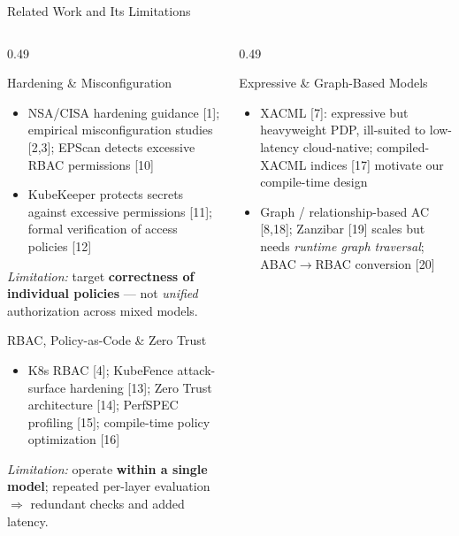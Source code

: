\documentclass[aspectratio=169,10pt]{beamer}
\newcommand{\tightitems}{%
  \setlength{\topsep}{1pt}%
  \setlength{\itemsep}{2pt}%
  \setlength{\parsep}{0pt}%
  \setlength{\parskip}{0pt}%
}
\begin{document}
\begin{frame}[t]{Related Work and Its Limitations}
\vspace{2pt}
\begin{columns}[T,onlytextwidth]
\begin{column}{0.49\textwidth}
\begin{callout}[fonttitle=\bfseries\scriptsize,fontupper=\tiny]{Hardening \& Misconfiguration}
\begin{itemize}\tightitems
\item NSA/CISA hardening guidance [1]; empirical misconfiguration studies [2,3]; EPScan detects excessive RBAC permissions [10]
\item KubeKeeper protects secrets against excessive permissions [11]; formal verification of access policies [12]
\end{itemize}
\emph{Limitation:} target \textbf{correctness of individual policies} --- not \emph{unified} authorization across mixed models.
\end{callout}
\vspace{2pt}
\begin{callout}[fonttitle=\bfseries\scriptsize,fontupper=\tiny]{RBAC, Policy-as-Code \& Zero Trust}
\begin{itemize}\tightitems
\item K8s RBAC [4]; KubeFence attack-surface hardening [13]; Zero Trust architecture [14]; PerfSPEC profiling [15]; compile-time policy optimization [16]
\end{itemize}
\emph{Limitation:} operate \textbf{within a single model}; repeated per-layer evaluation $\Rightarrow$ redundant checks and added latency.
\end{callout}
\end{column}
\begin{column}{0.49\textwidth}
\begin{callout}[fonttitle=\bfseries\scriptsize,fontupper=\tiny]{Expressive \& Graph-Based Models}
\begin{itemize}\tightitems
\item XACML [7]: expressive but heavyweight PDP, ill-suited to low-latency cloud-native; compiled-XACML indices [17] motivate our compile-time design
\item Graph / relationship-based AC [8,18]; Zanzibar [19] scales but needs \emph{runtime graph traversal}; ABAC$\to$RBAC conversion [20]

\end{itemize}
\end{callout}
\end{column}
\end{columns}
\end{frame}
\end{document}

